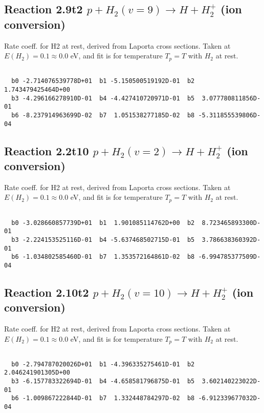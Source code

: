 \documentclass[12pt,dvipdfmx]{article}
\begin{document}
\newpage
\subsection{
Reaction 2.9t2
$ p + H_2(v=9) \rightarrow H + H_2^+$ (ion conversion)
}
Rate coeff. for H2 at rest, derived from Laporta cross sections.
Taken at $E(H_2) = 0.1 \approx 0.0$ eV,  and fit is for temperature $T_p=T$ with $H_2$ at rest.

\begin{small}\begin{verbatim}

  b0 -2.714076539778D+01  b1 -5.150500519192D-01  b2  1.743479425464D+00
  b3 -4.296166278910D-01  b4 -4.427410720971D-01  b5  3.077780811856D-01
  b6 -8.237914963699D-02  b7  1.051538277185D-02  b8 -5.311855539806D-04

\end{verbatim}\end{small}

\newpage
\subsection{
Reaction 2.2t10
$ p + H_2(v=2) \rightarrow H + H_2^+$ (ion conversion)
}
Rate coeff. for H2 at rest, derived from Laporta cross sections.
Taken at $E(H_2) = 0.1 \approx 0.0$ eV,  and fit is for temperature $T_p=T$ with $H_2$ at rest.

\begin{small}\begin{verbatim}

  b0 -3.028660857739D+01  b1  1.901085114762D+00  b2  8.723465893300D-01
  b3 -2.224153525116D-01  b4 -5.637468502715D-01  b5  3.786638360392D-01
  b6 -1.034802585460D-01  b7  1.353572164861D-02  b8 -6.994785377509D-04

\end{verbatim}\end{small}

\newpage
\subsection{
Reaction 2.10t2
$ p + H_2(v=10) \rightarrow H + H_2^+$ (ion conversion)
}
Rate coeff. for H2 at rest, derived from Laporta cross sections.
Taken at $E(H_2) = 0.1 \approx 0.0$ eV,  and fit is for temperature $T_p=T$ with $H_2$ at rest.

\begin{small}\begin{verbatim}

  b0 -2.794787020026D+01  b1 -4.396335275461D-01  b2  2.046241901305D+00
  b3 -6.157783322694D-01  b4 -4.658581796875D-01  b5  3.602140223022D-01
  b6 -1.009867222844D-01  b7  1.332448784297D-02  b8 -6.912339677032D-04

\end{verbatim}\end{small}
\end{document}
